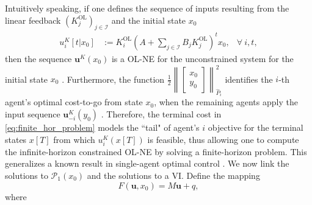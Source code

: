 \documentclass[letterpaper, 10 pt, conference]{ieeeconf}  %
\newcommand{\mc}{\mathcal}
\newcommand{\Kol}{K^{\mathrm{OL}}}
\newcommand{\bu}{\boldsymbol{u}}
\newcommand{\tsum}{\textstyle\sum}
\begin{document}
Intuitively speaking, if one defines the sequence of inputs
resulting from the linear feedback $(\Kol_j)_{j\in\mc I}$  and the initial state $x_0$
\begin{align}\label{eq:unconstrained_NE_state_sequence}
    u_i^K[t|x_0]&:= \Kol_i (A + \tsum_{j\in\mc I}B_j\Kol_j)^t x_0, & \forall~i, t,
\end{align}
then the sequence $\bu^K(x_0)$ is a OL-NE for the unconstrained system for the initial state $x_0$ \cite[Theorem 4.10]{monti2024feedback}. Furthermore, the function $\frac{1}{2}\left\| \begin{bmatrix}
    x_0\\ y_0
\end{bmatrix} \right\|^2_{\hat{P}_i}$ identifies the $i$-th agent's optimal cost-to-go from state $x_0$, when the remaining agents apply the input sequence $\bu^K_{-i}(y_0)$ \cite[Lemma 1]{benenati2024linear}. 
Therefore, the terminal cost in \eqref{eq:finite_hor_problem} models the ``tail" of agent's $i$ objective for the terminal states $x[T]$ from which $u_i^K(x[T])$ is feasible, thus allowing one to compute the infinite-horizon constrained OL-NE by solving  a finite-horizon problem. This generalizes a known result in single-agent optimal control \cite{bei_hu_toward_2002}. We now link the solutions to $\mc P_1(x_0)$ and the solutions to a VI. Define the mapping 
\begin{equation} \label{eq:def_F}
        F(\bu, x_0) = M\bu + q,
    \end{equation}
    where
\end{document}
